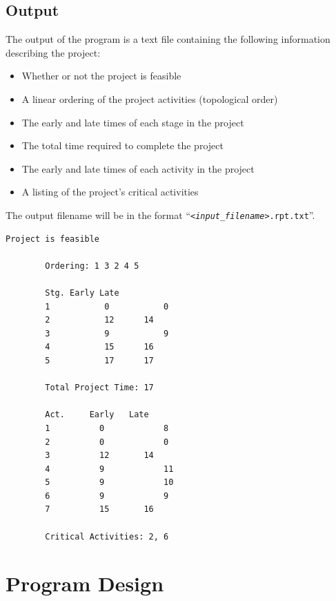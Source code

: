 	\subsection{Output}
	The output of the program is a text file containing the following information describing the project:
	\begin{itemize}
		\item Whether or not the project is feasible
		\item A linear ordering of the project activities (topological order)
		\item The early and late times of each stage in the project
		\item The total time required to complete the project
		\item The early and late times of each activity in the project
		\item A listing of the project's critical activities
	\end{itemize}
	The output filename will be in the format ``\texttt{\emph{<input\_filename>}.rpt.txt}''.
	\newpage
	\begin{lstlisting}[caption=Sample output]
		Project is feasible
		
		Ordering: 1 3 2 4 5
		
		Stg. Early Late
		1 	  		0 			0
		2 	  		12 		14
		3 	  		9 			9
		4 	  		15 		16
		5 	  		17 		17
		
		Total Project Time: 17
		
		Act.	 Early	 Late
		1 		   0 	 		8
		2 		   0 	 		0
		3 		   12 	 	14
		4 		   9 	 		11
		5 	 	   9 	 		10
		6 		   9 	 		9
		7 		   15 	 	16
		
		Critical Activities: 2, 6
	\end{lstlisting}
	\newpage
	
	\section{Program Design}
